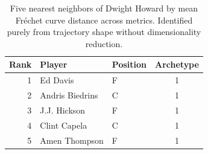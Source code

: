 \begin{table}[htbp]
  \centering\small
  \begin{tabular}{rllc}
    \toprule
    Rank & Player & Position & Archetype \\
    \midrule
    1 & Ed Davis & F & 1 \\
    2 & Andris Biedrins & C & 1 \\
    3 & J.J. Hickson & F & 1 \\
    4 & Clint Capela & C & 1 \\
    5 & Amen Thompson & F & 1 \\
    \bottomrule
  \end{tabular}
  \caption{Five nearest neighbors of Dwight Howard by mean Fr\'{e}chet curve distance across metrics. Identified purely from trajectory shape without dimensionality reduction.}
  \label{tab:Dwight_Howard_frechet_curve_neighbors}
\end{table}

